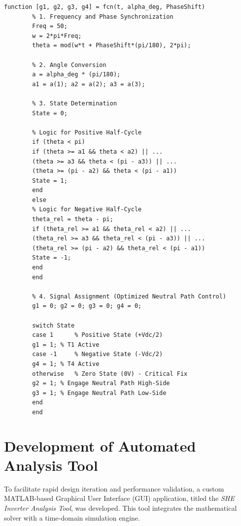 \documentclass[12pt, a4paper]{article}
\begin{document}
	\begin{lstlisting}[caption=Gate Logic Implementation for T-Type Topology]
		function [g1, g2, g3, g4] = fcn(t, alpha_deg, PhaseShift)
		% 1. Frequency and Phase Synchronization
		Freq = 50; 
		w = 2*pi*Freq;
		theta = mod(w*t + PhaseShift*(pi/180), 2*pi);
		
		% 2. Angle Conversion
		a = alpha_deg * (pi/180);
		a1 = a(1); a2 = a(2); a3 = a(3);
		
		% 3. State Determination
		State = 0; 
		
		% Logic for Positive Half-Cycle
		if (theta < pi) 
		if (theta >= a1 && theta < a2) || ...
		(theta >= a3 && theta < (pi - a3)) || ...
		(theta >= (pi - a2) && theta < (pi - a1))
		State = 1;
		end
		else 
		% Logic for Negative Half-Cycle
		theta_rel = theta - pi;
		if (theta_rel >= a1 && theta_rel < a2) || ...
		(theta_rel >= a3 && theta_rel < (pi - a3)) || ...
		(theta_rel >= (pi - a2) && theta_rel < (pi - a1))
		State = -1;
		end
		end
		
		% 4. Signal Assignment (Optimized Neutral Path Control)
		g1 = 0; g2 = 0; g3 = 0; g4 = 0;
		
		switch State
		case 1      % Positive State (+Vdc/2)
		g1 = 1; % T1 Active
		case -1     % Negative State (-Vdc/2)
		g4 = 1; % T4 Active
		otherwise   % Zero State (0V) - Critical Fix
		g2 = 1; % Engage Neutral Path High-Side
		g3 = 1; % Engage Neutral Path Low-Side
		end
		end
	\end{lstlisting}
	
	\section{Development of Automated Analysis Tool}
	To facilitate rapid design iteration and performance validation, a custom MATLAB-based Graphical User Interface (GUI) application, titled the \textit{SHE Inverter Analysis Tool}, was developed. This tool integrates the mathematical solver with a time-domain simulation engine.
	
\end{document}
